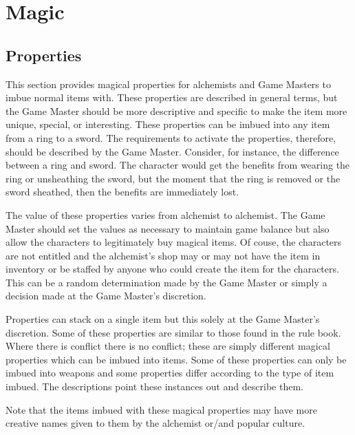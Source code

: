 \chapter{Magic}\label{chapter-magic}

\section{Properties}\label{mp}
This section provides
magical properties for alchemists and
Game Masters to imbue normal items with.
These properties are described in general terms,
but the Game Master should be more descriptive and specific
to make the item more unique, special, or interesting.
These properties can be imbued into any item from a ring to a sword.
The requirements to activate the properties, therefore, should be
described by the Game Master.
Consider, for instance, the difference between a ring and sword.
The character would get the benefits from wearing the ring or unsheathing the sword,
but the moment that the ring is removed or the sword sheathed, then the benefits are
immediately lost.

The value of these properties varies from alchemist to alchemist.
The Game Master should set the values as necessary to maintain game balance but also
allow the characters to legitimately buy magical items.
Of couse, the characters are not entitled and the alchemist's shop may or may not have
the item in inventory or be staffed by anyone who could create the item for the characters.
This can be a random determination made by the Game Master or simply a decision made at the
Game Master's discretion.

Properties can stack on a single item but this solely at the Game Master's discretion.
Some of these properties are similar to those found in the rule book.
Where there is conflict there is no conflict;
these are simply different magical properties which can be imbued into items.
Some of these properties can only be imbued into weapons and some properties
differ according to the type of item imbued.
The descriptions point these instances out and describe them.

Note that the items imbued with these
magical properties may have more creative
names given to them by the alchemist or/and
popular culture.

